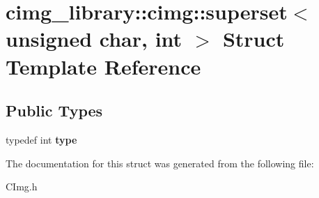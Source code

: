 \hypertarget{structcimg__library_1_1cimg_1_1superset_3_01unsigned_01char_00_01int_01_4}{\section{cimg\-\_\-library\-:\-:cimg\-:\-:superset$<$ unsigned char, int $>$ Struct Template Reference}
\label{structcimg__library_1_1cimg_1_1superset_3_01unsigned_01char_00_01int_01_4}
}
\subsection*{Public Types}
\begin{DoxyCompactItemize}
\item 
\hypertarget{structcimg__library_1_1cimg_1_1superset_3_01unsigned_01char_00_01int_01_4_ab06b3f16805a2d0b188139b046bc8288}{typedef int {\bfseries type}}\label{structcimg__library_1_1cimg_1_1superset_3_01unsigned_01char_00_01int_01_4_ab06b3f16805a2d0b188139b046bc8288}

\end{DoxyCompactItemize}


The documentation for this struct was generated from the following file\-:\begin{DoxyCompactItemize}
\item 
C\-Img.\-h\end{DoxyCompactItemize}

